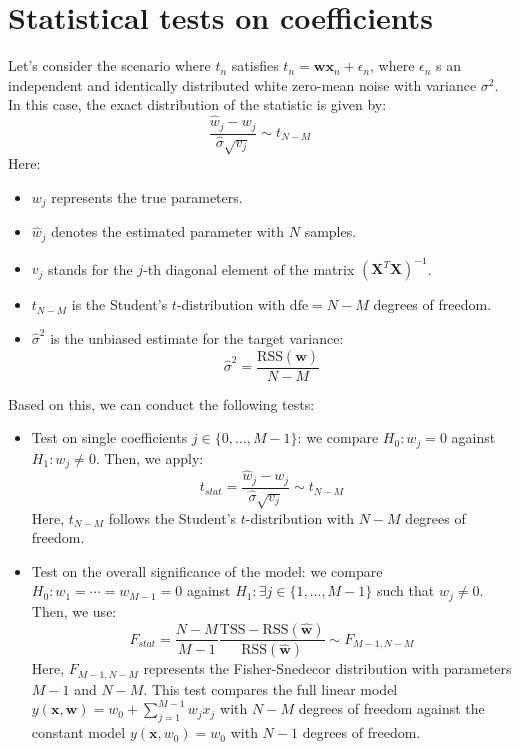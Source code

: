 \section{Statistical tests on coefficients}

Let's consider the scenario where $t_n$ satisfies $t_n=\textbf{w}\textbf{x}_n+\epsilon_n$, where $\epsilon_n$ s an independent and identically distributed white zero-mean noise with variance $\sigma^2$. 
In this case, the exact distribution of the statistic is given by:
\[\dfrac{\hat{w}_j-w_j}{\hat{\sigma}\sqrt{v_j}}\sim t_{N-M}\]
Here: 
\begin{itemize}
    \item $w_j$ represents the true parameters.
    \item $\hat{w}_j$ denotes the estimated parameter with $N$ samples.
    \item $v_j$ stands for the $j$-th diagonal element of the matrix ${\left(\textbf{X}^T\textbf{X}\right)}^{-1}$.
    \item $t_{N-M}$ is the Student's $t$-distribution with $\text{dfe}=N-M$ degrees of freedom.
    \item $\hat{\sigma}^2$ is the unbiased estimate for the target variance: 
        \[\hat{\sigma}^2=\dfrac{\text{RSS}(\hat{\textbf{w}})}{N-M}\]
\end{itemize}
Based on this, we can conduct the following tests:
\begin{itemize}
    \item Test on single coefficients $j \in \{0, \dots , M - 1\}$: we compare $H_0:w_j=0$ against $H_1:w_j\neq 0$. 
        Then, we apply:
        \[t_{stat}=\dfrac{\hat{w}_j-w_j}{\hat{\sigma}\sqrt{v_j}}\sim t_{N-M}\]
        Here, $t_{N-M}$ follows the Student's $t$-distribution with $N - M$ degrees of freedom.
    \item Test on the overall significance of the model: we compare $H_0:w_1=\cdots=w_{M-1}=0$ against  $H_1:\exists j\in\{1,\dots,M-1\}$ such that $w_j \neq 0$. 
        Then, we use:
        \[F_{stat}=\dfrac{N-M}{M-1}\dfrac{\text{TSS}-\text{RSS}(\hat{\textbf{w}})}{\text{RSS}(\hat{\textbf{w}})}\sim F_{M-1,N-M}\]
        Here, $F_{M-1,N-M}$ represents the Fisher-Snedecor distribution with parameters $M - 1$ and $N - M$.
        This test compares the full linear model $y(\textbf{x},\textbf{w})=w_0+\sum_{j=1}^{M-1}w_j x_j$ with $N-M$ degrees of freedom against the constant model $y(\textbf{x},w_0)=w_0$ with $N - 1$ degrees of freedom. 
\end{itemize}